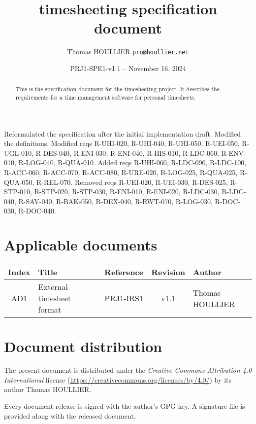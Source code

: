 \documentclass[letterpaper]{article}
\title{timesheeting specification document}
\author{Thomas HOULLIER \href{mailto:pro@houllier.net}
         {\texttt{\textlangle pro@houllier.net\textrangle}}}
\begin{document}
\frenchspacing
\date{PRJ1-SPE1-v1.1 -- November 16, 2024}
\maketitle
\thispagestyle{FirstPage}

\begin{abstract}
  This is the specification document for the timesheeting project.
  It describes the requirements for a time management software for
  personal timesheets.
\end{abstract}

\begin{versionhistory}
  {Reformulated the specification after the initial implementation draft.
    Modified the definitions.
    Modified reqs R-UHI-020, R-UHI-040, R-UHI-050, R-UEI-050, R-UGL-010,
    R-DES-040, R-ENI-030, R-ENI-040, R-HIS-010, R-LDC-060, R-ENV-010,
    R-LOG-040, R-QUA-010.
    Added reqs R-UHI-060, R-LDC-090, R-LDC-100, R-ACC-060, R-ACC-070,
    R-ACC-080, R-URE-020, R-LOG-025, R-QUA-025, R-QUA-050, R-REL-070.
    Removed reqs R-UEI-020, R-UEI-030, R-DES-025, R-STP-010, R-STP-020,
    R-STP-030, R-ENI-010, R-ENI-020, R-LDC-030, R-LDC-040, R-SAV-040,
    R-BAK-050, R-DEX-040, R-RWT-070, R-LOG-030, R-DOC-030, R-DOC-040.}
\end{versionhistory}
\setcounter{table}{0} %

\section*{Applicable documents}
{ \centering
\begin{tabularx}{\textwidth}{| c | X | c | c | X |} \hline
  Index & Title & Reference & Revision & Author \\ \hline
  AD1   & External timesheet format & PRJ1-IRS1 & v1.1 & Thomas HOULLIER \\
  \hline \end{tabularx} \par }

\section*{Document distribution}
The present document is distributed under the \emph{Creative Commons Attribution
4.0 International} license (\url{https://creativecommons.org/licenses/by/4.0/})
by its author Thomas HOULLIER.

Every document release is signed with the author's GPG key. A signature file
is provided along with the released document.

\tableofcontents
\printglossary[type=\acronymtype,style=index]
\pagestyle{plain}




\appendix


\apptocmd{\thebibliography}{\raggedright}{}{}
\begingroup
{}
\setlength\bibitemsep{0pt}
\printbibliography
\endgroup
\end{document}
